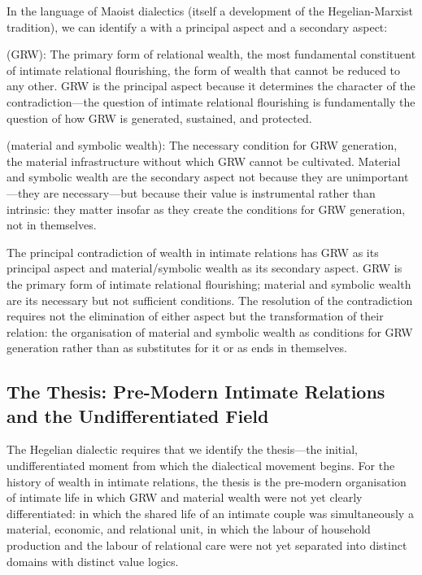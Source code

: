 In the language of Maoist dialectics (itself a development of the Hegelian-Marxist tradition), we can identify a  with a principal aspect and a secondary aspect:

 (GRW): The primary form of relational wealth, the most fundamental constituent of intimate relational flourishing, the form of wealth that cannot be reduced to any other. GRW is the principal aspect because it determines the character of the contradiction---the question of intimate relational flourishing is fundamentally the question of how GRW is generated, sustained, and protected.

 (material and symbolic wealth): The necessary condition for GRW generation, the material infrastructure without which GRW cannot be cultivated. Material and symbolic wealth are the secondary aspect not because they are unimportant---they are necessary---but because their value is instrumental rather than intrinsic: they matter insofar as they create the conditions for GRW generation, not in themselves.

\begin{claim}
The principal contradiction of wealth in intimate relations has GRW as its principal aspect and material/symbolic wealth as its secondary aspect. GRW is the primary form of intimate relational flourishing; material and symbolic wealth are its necessary but not sufficient conditions. The resolution of the contradiction requires not the elimination of either aspect but the transformation of their relation: the organisation of material and symbolic wealth as conditions for GRW generation rather than as substitutes for it or as ends in themselves.
\end{claim}

\subsection{The Thesis: Pre-Modern Intimate Relations and the Undifferentiated Field}
\label{p15:subsec:thesis}

\noindent
The Hegelian dialectic requires that we identify the thesis---the initial, undifferentiated moment from which the dialectical movement begins. For the history of wealth in intimate relations, the thesis is the pre-modern organisation of intimate life in which GRW and material wealth were not yet clearly differentiated: in which the shared life of an intimate couple was simultaneously a material, economic, and relational unit, in which the labour of household production and the labour of relational care were not yet separated into distinct domains with distinct value logics.

